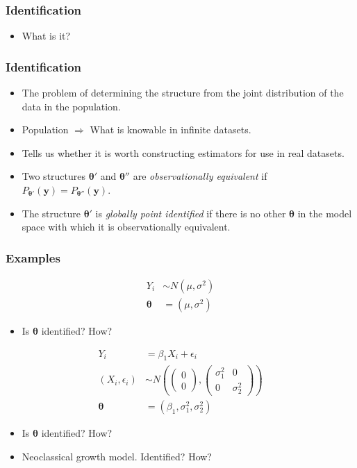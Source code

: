 \documentclass[english,xcolor=svgnames]{beamer}
\begin{document}
\begin{frame}
\frametitle[alignment=center]{Identification}
\begin{itemize}
	\item What is it?
\end{itemize}
\end{frame}

\begin{frame}
\frametitle[alignment=center]{Identification}
\begin{itemize}
	\item The problem of determining the structure from the joint distribution of the data in the population.
	\item Population $\Rightarrow$ What is knowable in infinite datasets.
	\item Tells us whether it is worth constructing estimators for use in real datasets.
	\item Two structures $\bm{\theta}'$ and $\bm{\theta}''$ are \emph{observationally equivalent} if $P_{\bm{\theta}'}(\bm{y})=P_{\bm{\theta}''}(\bm{y})$.
	\item The structure $\bm{\theta}'$ is \emph{globally point identified} if there is no other $\bm{\theta}$ in the model space with which it is observationally equivalent.
\end{itemize}
\end{frame}

\begin{frame}
\frametitle[alignment=center]{Examples}
\begin{align*}
	Y_i &\sim N(\mu, \sigma^2) \\
	\bm{\theta} &= (\mu,\sigma^2)
\end{align*}
\begin{itemize}
	\item Is $\bm{\theta}$ identified? How?
\end{itemize}
\begin{align*}
		Y_i &= \beta_1 X_i + \epsilon_i \\
		(X_i, \epsilon_i) &\sim N\left(\begin{pmatrix} 0 \\ 0 \end{pmatrix} ,\begin{pmatrix} \sigma_1^2 & 0 \\ 0 & \sigma_2^2 \end{pmatrix} \right) \\
		\bm{\theta} &= (\beta_1,\sigma_1^2,\sigma_2^2)
	\end{align*}
\begin{itemize}
	\item Is $\bm{\theta}$ identified? How?
	\item Neoclassical growth model. Identified? How?
\end{itemize}
\end{frame}
\end{document}
